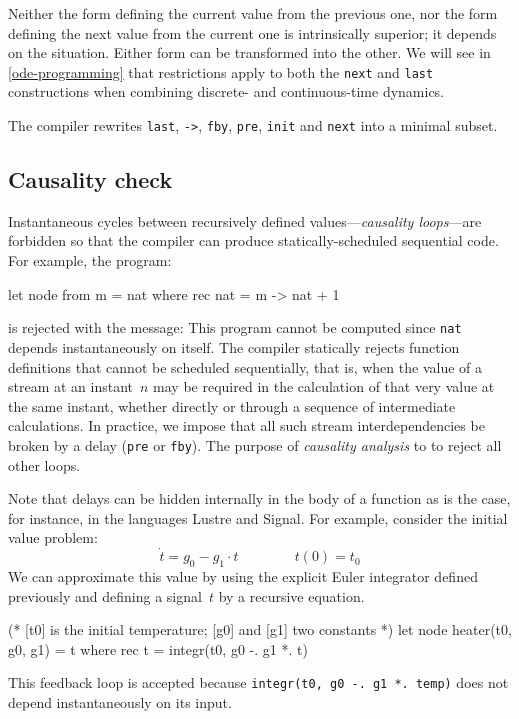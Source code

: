 \documentclass[11pt,titlepage,twoside]{report}
\makeatletter
\newcommand{\zls}[1]{{\@span{class="zelusinline"}#1}}
\newcommand{\zls}[1]{\texttt{#1}}
\renewcommand{\zls}[1]{\texttt{#1}}
\newcommand{\lustre}{{\sf Lustre}}
\newcommand{\signal}{{\sf Signal}}
\newcommand{\Remark}{\medskip\noindent{\bf Remark: }}
\makeatother
\begin{document}
Neither the form defining the current value from the previous one, nor the 
form defining the next value from the current one is intrinsically superior; 
it depends on the situation.
Either form can be transformed into the other.
We will see in \cref{ode-programming} that restrictions apply to both the 
\zls{next} and \zls{last} constructions when combining discrete- and
continuous-time dynamics.

\Remark The compiler rewrites \zls{last}, \zls{->}, \zls{fby}, \zls{pre}, 
\zls{init} and \zls{next} into a minimal subset.

\subsection{Causality check\label{causalcheck}} %

Instantaneous cycles between recursively defined values---\emph{causality 
loops}---are forbidden so that the compiler can produce statically-scheduled 
sequential code.
For example, the program:%
\begin{chklisting}[fail]
let node from m = nat where
  rec nat = m -> nat + 1
\end{chklisting}
is rejected with the message:
\chklistingerr{}
\noindent
This program cannot be computed since \zls{nat} depends instantaneously on 
itself.
The compiler statically rejects function definitions that cannot be 
scheduled sequentially, that is, when the value of a stream at an 
instant~$n$ may be required in the calculation of that very value at the 
same instant, whether directly or through a sequence of intermediate 
calculations.
In practice, we impose that all such stream interdependencies be broken by a 
delay (\zls{pre} or \zls{fby}).
The purpose of \emph{causality analysis} to to reject all other loops.

Note that delays can be hidden internally in the body of a function as
is the case, for instance, in the languages \lustre{} and \signal.
For example, consider the initial value problem:
\[
\dot{t} = g_0 - g_1 \cdot t \qquad\qquad t(0) = t_0
\]
We can approximate this value by using the explicit Euler integrator defined 
previously and defining a signal~$t$ by a recursive equation.
\begin{chklisting}[withresult,include=integr]
(* [t0] is the initial temperature; [g0] and [g1] two constants *)
let node heater(t0, g0, g1) = t where
  rec t = integr(t0, g0 -. g1 *. t)
\end{chklisting}
This feedback loop is accepted because \zls{integr(t0, g0 -. g1 *. temp)} 
does not depend instantaneously on its input.
\end{document}
